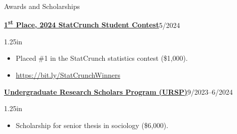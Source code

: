 \documentclass[12pt]{resume} %
\newcommand{\righthandindent}{1.25in}
\begin{document}
\begin{rSection}{Awards and Scholarships}

\href{https://bit.ly/StatCrunchWinners}{\textbf{1\textsuperscript{st} Place, 2024 StatCrunch Student Contest}}\hfill{}5/2024
\begin{adjustwidth}{0pt}{\righthandindent}
\vspace{-7pt}
\begin{itemize}
    \item[] Placed \#1 in the StatCrunch statistics contest (\$\thinspace{}1,000).
    \vspace{-7pt}
    \item[] \href{https://bit.ly/StatCrunchWinners}{https://bit.ly/StatCrunchWinners}
\end{itemize}
\end{adjustwidth}

\href{https://hass.ugresearch.ucla.edu/scholarships/ursp/students/}{\textbf{Undergraduate Research Scholars Program (URSP)}}\hfill{}9/2023--6/2024
\begin{adjustwidth}{0pt}{\righthandindent}
\vspace{-7pt}
\begin{itemize}
    \item[] Scholarship for senior thesis in sociology (\$\thinspace{}6,000).
\end{itemize}
\end{adjustwidth}


\end{rSection}
\end{document}
